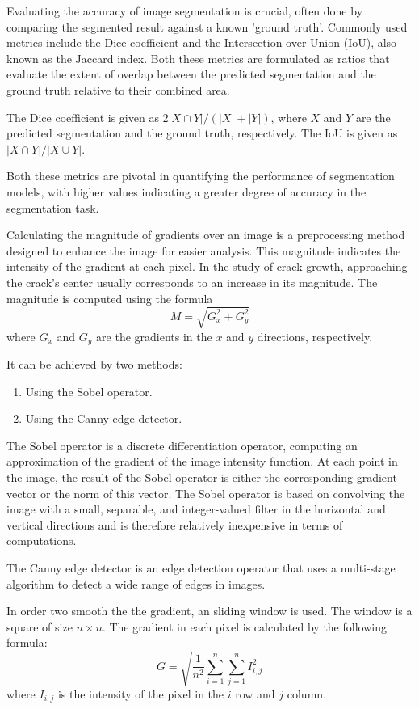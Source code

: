 \documentclass[preprint,12pt]{elsarticle}
\begin{document}
Evaluating the accuracy of image segmentation is crucial, often done by comparing the segmented result against a known 'ground truth'.
Commonly used metrics include the Dice coefficient and the Intersection over Union (IoU),
also known as the Jaccard index.
Both these metrics are formulated as ratios that evaluate the extent of overlap between the predicted segmentation and the ground truth relative to their combined area.

The Dice coefficient is given as $2|X \cap Y|/(|X|+|Y|)$, where $X$ and $Y$ are the predicted segmentation and the ground truth, respectively.
The IoU is given as $|X \cap Y|/|X \cup Y|$.

Both these metrics are pivotal in quantifying the performance of segmentation models, with higher values indicating a greater degree of accuracy in the segmentation task.

Calculating the magnitude of gradients over an image is a preprocessing method designed to enhance the image for easier analysis.
This magnitude indicates the intensity of the gradient at each pixel.
In the study of crack growth, approaching the crack's center usually corresponds to an increase in its magnitude.
The magnitude is computed using the formula
\begin{equation}
\label{eq:magnitude}
M=\sqrt{G_x^2+G_y^2}
\end{equation}
where $G_x$ and $G_y$ are the gradients in the $x$ and $y$ directions, respectively.

It can be achieved by two methods:
\begin{enumerate}
  \item Using the Sobel operator.
  \item Using the Canny edge detector.
\end{enumerate}

The Sobel operator is a discrete differentiation operator, computing an approximation of the gradient of the image intensity function.
At each point in the image, the result of the Sobel operator is either the corresponding gradient vector or the norm of this vector.
The Sobel operator is based on convolving the image with a small, separable, and integer-valued filter in the horizontal and vertical directions and is therefore relatively inexpensive in terms of computations.

The Canny edge detector is an edge detection operator that uses a multi-stage algorithm to detect a wide range of edges in images.

In order two smooth the the gradient, an sliding window is used.
The window is a square of size $n \times n$.
The gradient in each pixel is calculated by the following formula:
\begin{equation}
\label{eq:gradient}
G=\sqrt{\frac{1}{n^2}\sum_{i=1}^{n}\sum_{j=1}^{n}I_{i,j}^2}
\end{equation}
where $I_{i,j}$ is the intensity of the pixel in the $i$ row and $j$ column.
\end{document}
